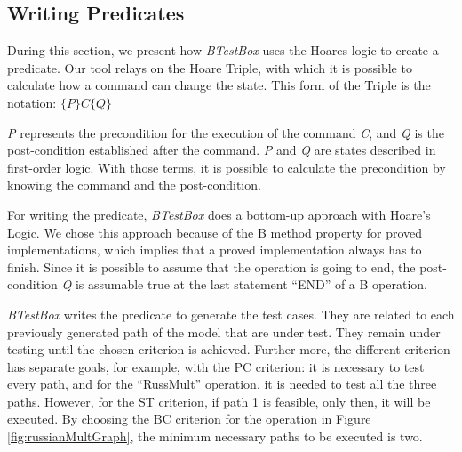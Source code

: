 \documentclass[runningheads]{llncs}
\begin{document}
\subsection{Writing Predicates} \label{writingPredicates}

During this section, we present how \textit{BTestBox} uses the Hoare\textquotesingle s logic to create a predicate. Our tool relays on the Hoare Triple, with which it is possible to calculate how a command can change the state. 
This form of the Triple is the notation: $\{P\} C \{Q\}$

\textit{P} represents the precondition for the execution of the command \textit{C}, and \textit{Q} is the post-condition established after the command. \textit{P} and \textit{Q} are states described in first-order logic. With those terms, it is possible to calculate the precondition by knowing the command and the post-condition. 

For writing the predicate, \textit{BTestBox} does a bottom-up approach with Hoare's Logic. We chose this approach because of the B method property for proved implementations, which implies that a proved implementation always has to finish. Since it is possible to assume that the operation is going to end, the post-condition \textit{Q} is assumable true at the last statement ``END'' of a B operation.


 \textit{BTestBox} writes the predicate to generate the test cases. They are related to each previously generated path of the model that are under test. They remain under testing until the chosen criterion is achieved. Further more, the different criterion has separate goals, for example, with the PC criterion: it is necessary to test every path, and for the ``RussMult'' operation, it is needed to test all the three paths. However, for the ST criterion, if path 1 is feasible, only then, it will be executed. By choosing the BC criterion for the operation in Figure \ref{fig:russianMultGraph}, the minimum necessary paths to be executed is two.
\end{document}
